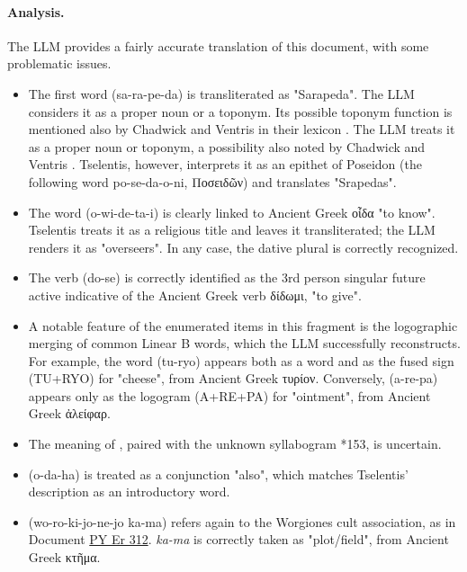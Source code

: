 \paragraph{Analysis.}
The LLM provides a fairly accurate translation of this document, with some problematic issues.
\begin{itemize}
  \item The first word \textlinb{\Bsa\Bra\Be\Bpe\Bda} (sa-ra-pe-da) is transliterated as "Sarapeda". The LLM considers it as a proper noun or a toponym. Its possible toponym function is mentioned also by Chadwick and Ventris in their lexicon \cite{chadwick-notes}.
  The LLM treats it as a proper noun or toponym, a possibility also noted by Chadwick and Ventris \cite{chadwick-notes}. Tselentis, however, interprets it as an epithet of Poseidon (the following word \textlinb{\Bpo\Bse\Bda\Bo\Bni} po-se-da-o-ni, \textgreek{Ποσειδῶν}) and translates "Srapedas".
  \item The word \textlinb{\Bo\Bwi\Bde\Bta\Bi} (o-wi-de-ta-i) is clearly linked to Ancient Greek \textgreek{οἶδα} "to know".
  Tselentis treats it as a religious title and leaves it transliterated; the LLM renders it as "overseers". In any case, the dative plural is correctly recognized.
  \item The verb \textlinb{\Bdo\Bse} (do-se) is correctly identified as the 3rd person singular future active indicative of the Ancient Greek verb \textgreek{δίδωμι}, "to give".
  \item A notable feature of the enumerated items in this fragment is the logographic merging of common Linear B words, which the LLM successfully reconstructs.
  For example, the word \textlinb{\Btu\Broii} (tu-ryo) appears both as a word and as the fused sign (TU+RYO) for "cheese", from Ancient Greek \textgreek{τυρίον}. 
  Conversely, \textlinb{\Ba\Bre\Bpa} (a-re-pa) appears only as the logogram (A+RE+PA) for "ointment", from Ancient Greek \textgreek{ἀλείφαρ}.
  \item The meaning of \textlinb{\Bko\Bwo}, paired with the unknown syllabogram *153, is uncertain.
  \item \textlinb{\Bo\Bda\Baii} (o-da-ha) is treated as a conjunction "also", which matches Tselentis' description as an introductory word.
  \item \textlinb{\Bwo\Bro\Bki\Bjo\Bne\Bjo} \textlinb{\Bka\Bma} (wo-ro-ki-jo-ne-jo ka-ma) refers again to the Worgiones cult association, as in Document \hyperref[doc:pyer312]{PY Er 312}.
  \textit{ka-ma} is correctly taken as "plot/field", from Ancient Greek \textgreek{κτῆμα}.
\end{itemize}

